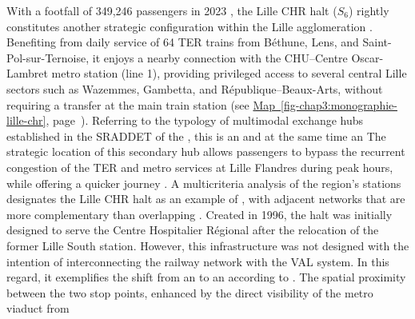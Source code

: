 \begin{refsegment}
With a footfall of 349,246 passengers in 2023 \textcolor{blue}{\autocite{sncf_frequentation_2024}}, the Lille CHR halt (\(S_6\)) rightly constitutes another strategic  configuration within the Lille agglomeration \textcolor{blue}{\autocite[144]{menerault_recherche_2020}}. Benefiting from daily service of 64 \acrshort{TER} trains from Béthune, Lens, and Saint-Pol-sur-Ternoise, it enjoys a nearby connection with the CHU–Centre Oscar-Lambret metro station (line 1), providing privileged access to several central Lille sectors such as Wazemmes, Gambetta, and République–Beaux-Arts, without requiring a transfer at the main train station (see \hyperref[fig-chap3:monographie-lille-chr]{Map~\ref{fig-chap3:monographie-lille-chr}}, page~\pageref{fig-chap3:monographie-lille-chr}). Referring to the typology of multimodal exchange hubs established in the \acrshort{SRADDET} of the \textcolor{blue}{\textcite[83-84]{region_hauts-de-france_sraddet_2024}}, this is an  and at the same time an  The strategic location of this secondary hub allows passengers to bypass the recurrent congestion of the \acrshort{TER} and metro services at Lille Flandres during peak hours, while offering a quicker journey \textcolor{blue}{\autocite[130]{fleury_gestion_2002}}. A multicriteria analysis of the region's stations designates the Lille CHR halt as an example of  \textcolor{blue}{\autocite[129]{fleury_gestion_2002}}, with adjacent networks that are more complementary than overlapping \textcolor{blue}{\autocite[107]{menerault_gares_2001}}. Created in 1996, the halt was initially designed to serve the Centre Hospitalier Régional after the relocation of the former Lille South station. However, this infrastructure was not designed with the intention of interconnecting the railway network with the \acrfull{VAL} system. In this regard, it exemplifies the shift from an  to an  according to \textcolor{blue}{\textcite[109]{barre_interconnexion_2001}}. The spatial proximity between the two stop points, enhanced by the direct visibility of the metro viaduct from 
\end{refsegment}
